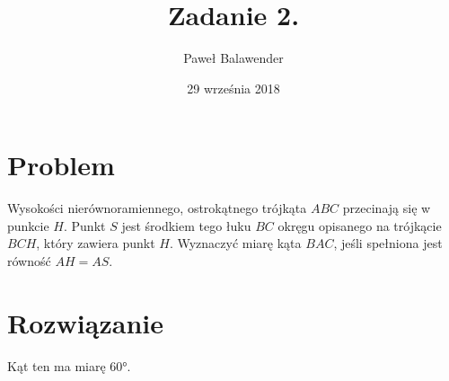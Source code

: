 \documentclass[12pt]{article}
\title{Zadanie 2.}
\date{29 września 2018}
\author{Paweł Balawender}
\begin{document}
\maketitle

\section*{Problem}
\begin{justify}
Wysokości nierównoramiennego, ostrokątnego trójkąta $ABC$ przecinają się \linebreak
w punkcie $H$. Punkt $S$ jest środkiem tego łuku $BC$ okręgu opisanego na trójkącie
$BCH$, który zawiera punkt $H$. Wyznaczyć miarę kąta $BAC$, jeśli spełniona jest
równość $AH = AS$.

\section*{Rozwiązanie}

Kąt ten ma miarę \ang{60}.


\end{justify}
\end{document}
